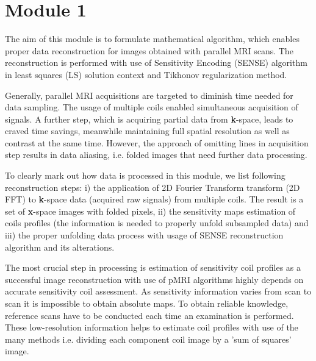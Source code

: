 \section{Module 1}

The aim of this module is to formulate mathematical algorithm, which
enables proper data reconstruction for images obtained with parallel
MRI scans. The reconstruction is performed with use of Sensitivity
Encoding (SENSE) algorithm in least squares (LS) solution context
and Tikhonov regularization method.

Generally, parallel MRI acquisitions are targeted to diminish time
needed for data sampling. The usage of multiple coils enabled simultaneous
acquisition of signals. A further step, which is acquiring partial
data from \textbf{k}-space, leads to craved time savings, meanwhile
maintaining full spatial resolution as well as contrast at the same
time. However, the approach of omitting lines in acquisition step
results in data aliasing, i.e. folded images that need further data
processing.

To clearly mark out how data is processed in this module, we list
following reconstruction steps: i) the application of 2D Fourier Transform
transform (2D FFT) to \textbf{k}-space data (acquired raw signals)
from multiple coils. The result is a set of \textbf{x}-space images
with folded pixels, ii) the sensitivity maps estimation of coils profiles
(the information is needed to properly unfold subsampled data) and
iii) the proper unfolding data process with usage of SENSE reconstruction
algorithm and its alterations.

The most crucial step in processing is estimation of sensitivity coil
profiles as a successful image reconstruction with use of pMRI algorithms
highly depends on accurate sensitivity coil assessment. As sensitivity
information varies from scan to scan it is impossible to obtain absolute
maps. To obtain reliable knowledge, reference scans have to be conducted
each time an examination is performed. These low-resolution information
helps to estimate coil profiles with use of the many methods i.e.
dividing each component coil image by a 'sum of squares' image.

